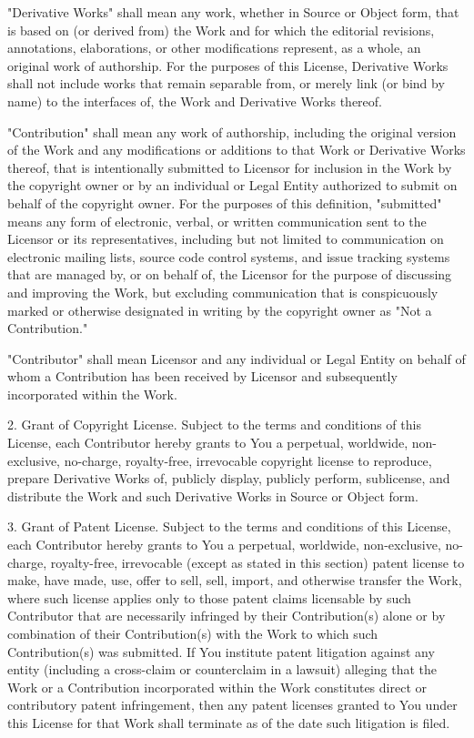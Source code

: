 \documentclass[twoside]{tceusermanual}
\begin{document}
      "Derivative Works" shall mean any work, whether in Source or Object
      form, that is based on (or derived from) the Work and for which the
      editorial revisions, annotations, elaborations, or other modifications
      represent, as a whole, an original work of authorship. For the purposes
      of this License, Derivative Works shall not include works that remain
      separable from, or merely link (or bind by name) to the interfaces of,
      the Work and Derivative Works thereof.

      "Contribution" shall mean any work of authorship, including
      the original version of the Work and any modifications or additions
      to that Work or Derivative Works thereof, that is intentionally
      submitted to Licensor for inclusion in the Work by the copyright owner
      or by an individual or Legal Entity authorized to submit on behalf of
      the copyright owner. For the purposes of this definition, "submitted"
      means any form of electronic, verbal, or written communication sent
      to the Licensor or its representatives, including but not limited to
      communication on electronic mailing lists, source code control systems,
      and issue tracking systems that are managed by, or on behalf of, the
      Licensor for the purpose of discussing and improving the Work, but
      excluding communication that is conspicuously marked or otherwise
      designated in writing by the copyright owner as "Not a Contribution."

      "Contributor" shall mean Licensor and any individual or Legal Entity
      on behalf of whom a Contribution has been received by Licensor and
      subsequently incorporated within the Work.

   2. Grant of Copyright License. Subject to the terms and conditions of
      this License, each Contributor hereby grants to You a perpetual,
      worldwide, non-exclusive, no-charge, royalty-free, irrevocable
      copyright license to reproduce, prepare Derivative Works of,
      publicly display, publicly perform, sublicense, and distribute the
      Work and such Derivative Works in Source or Object form.

   3. Grant of Patent License. Subject to the terms and conditions of
      this License, each Contributor hereby grants to You a perpetual,
      worldwide, non-exclusive, no-charge, royalty-free, irrevocable
      (except as stated in this section) patent license to make, have made,
      use, offer to sell, sell, import, and otherwise transfer the Work,
      where such license applies only to those patent claims licensable
      by such Contributor that are necessarily infringed by their
      Contribution(s) alone or by combination of their Contribution(s)
      with the Work to which such Contribution(s) was submitted. If You
      institute patent litigation against any entity (including a
      cross-claim or counterclaim in a lawsuit) alleging that the Work
      or a Contribution incorporated within the Work constitutes direct
      or contributory patent infringement, then any patent licenses
      granted to You under this License for that Work shall terminate
      as of the date such litigation is filed.
\end{document}
